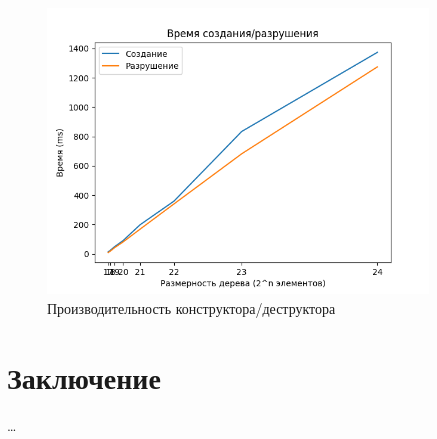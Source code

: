 \documentclass{article}
\begin{document}
\begin{figure}[H]
    \centering
    \includegraphics[width=0.9\textwidth]{plots/cr-des.png}
    \caption{Производительность конструктора/деструктора}
\end{figure}
\section{Заключение}
\dots
\nocite{*}
\printbibliography
\end{document}
